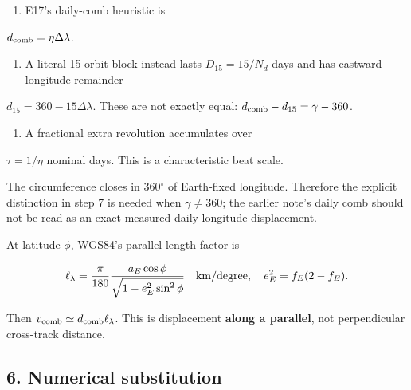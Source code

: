 \documentclass[10pt,a4paper]{article}
\numberwithin{equation}{section}
\begin{document}
\begin{enumerate}[start=6]
\item E17's daily-comb heuristic is
\end{enumerate}
\begin{sloppypar}   \(d_{\rm comb}=\eta\Delta\lambda\).\end{sloppypar}

\begin{enumerate}[start=7]
\item A literal 15-orbit block instead lasts \(D_{15}=15/N_d\) days and has eastward longitude remainder
\end{enumerate}
\begin{sloppypar}   \(d_{15}=360-15\Delta\lambda\).    These are not exactly equal: \(d_{\rm comb}-d_{15}=\gamma-360\).\end{sloppypar}

\begin{enumerate}[start=8]
\item A fractional extra revolution accumulates over
\end{enumerate}
\begin{sloppypar}   \(\tau=1/\eta\) nominal days. This is a characteristic beat scale.\end{sloppypar}


\begin{sloppypar}The circumference closes in 360\ensuremath{{}^{\circ}} of Earth-fixed longitude. Therefore the explicit distinction in step 7 is needed when \(\gamma\ne360\); the earlier note's daily comb should not be read as an exact measured daily longitude displacement.\end{sloppypar}


\begin{sloppypar}At latitude \(\phi\), WGS84's parallel-length factor is\end{sloppypar}


\begin{equation}\ell_\lambda=\frac{\pi}{180}
\frac{a_E\cos\phi}{\sqrt{1-e_E^2\sin^2\phi}}
\quad {\rm km/degree},
\quad e_E^2=f_E(2-f_E).\label{eq:ch5-5}\end{equation}

\begin{sloppypar}Then \(v_{\rm comb}\simeq d_{\rm comb}\ell_\lambda\). This is displacement \textbf{along a parallel}, not perpendicular cross-track distance.\end{sloppypar}


\subsection*{6. Numerical substitution}
\end{document}
